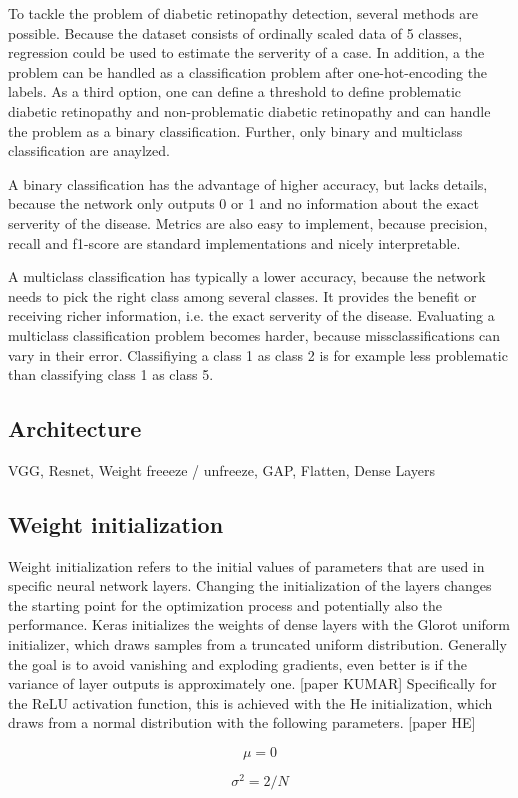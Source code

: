 \documentclass{article}
\begin{document}
To tackle the problem of diabetic retinopathy detection, several methods are possible. Because the dataset consists of 
ordinally scaled data of 5 classes, regression could be used to estimate the serverity of a case. In addition, a the problem 
can be handled as a classification problem after one-hot-encoding the labels. As a third option, one can define a threshold 
to define problematic diabetic retinopathy and non-problematic diabetic retinopathy and can handle the problem as a binary 
classification. Further, only binary and multiclass classification are anaylzed.

A binary classification has the advantage of higher accuracy, but lacks details, because the network only outputs 0 or 1
and no information about the exact serverity of the disease. Metrics are also easy to implement, because precision, 
recall and f1-score are standard implementations and nicely interpretable.

A multiclass classification has typically a lower accuracy, because the network needs to pick the right class among 
several classes. It provides the benefit or receiving richer information, i.e. the exact serverity of the disease.
Evaluating a multiclass classification problem becomes harder, because missclassifications can vary in their error.
Classifiying a class 1 as class 2 is for example less problematic than classifying class 1 as class 5.


\subsection{Architecture}
VGG, Resnet, Weight freeeze / unfreeze, GAP, Flatten, Dense Layers
\subsection{Weight initialization}
Weight initialization refers to the initial values of parameters that are used in specific neural network layers.
Changing the initialization of the layers changes the starting point for the optimization process and potentially also the performance.
Keras initializes the weights of dense layers with the Glorot uniform initializer, which draws samples from a truncated uniform distribution.
Generally the goal is to avoid vanishing and exploding gradients, even better is if the variance of layer outputs is approximately one. [paper KUMAR]
Specifically for the ReLU activation function, this is achieved with the He initialization, which draws from a normal distribution with the following parameters. [paper HE]\\
\begin{minipage}{.5\linewidth}
  \begin{equation}
    \mu = 0
  \end{equation}
\end{minipage}
\begin{minipage}{.5\linewidth}
  \begin{equation}
    \sigma^2 = 2/N
  \end{equation}
\end{minipage}
\end{document}
